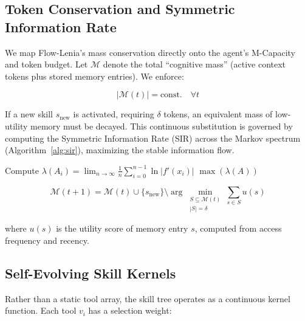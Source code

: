\documentclass[11pt,a4paper]{article}
\begin{document}
\subsection{Token Conservation and Symmetric Information Rate}

We map Flow-Lenia's mass conservation directly onto the agent's M-Capacity and token budget. Let $\mathcal{M}$ denote the total ``cognitive mass'' (active context tokens plus stored memory entries). We enforce:

\begin{equation}
    |\mathcal{M}(t)| = \text{const.} \quad \forall t
    \label{eq:mass_conservation}
\end{equation}

\noindent If a new skill $s_{\text{new}}$ is activated, requiring $\delta$ tokens, an equivalent mass of low-utility memory must be decayed. This continuous substitution is governed by computing the Symmetric Information Rate (SIR) across the Markov spectrum (Algorithm~\ref{alg:sir}), maximizing the stable information flow.

\begin{algorithm}[h]
\caption{Compute Symmetric Information Rate (SIR)}
\label{alg:sir}
\begin{algorithmic}[1]
        \State Compute $\lambda(A_i) = \lim_{n\to\infty} \frac{1}{n} \sum_{i=0}^{n-1} \ln |f'(x_i)|$
    \EndFor
    \State \Return $\max(\lambda(A))$
\EndProcedure
\end{algorithmic}
\end{algorithm}

\begin{equation}
    \mathcal{M}(t+1) = \mathcal{M}(t) \cup \{s_{\text{new}}\} \setminus \arg\min_{\substack{S \subseteq \mathcal{M}(t) \\ |S| = \delta}} \sum_{s \in S} u(s)
    \label{eq:decay}
\end{equation}

\noindent where $u(s)$ is the utility score of memory entry $s$, computed from access frequency and recency.

\subsection{Self-Evolving Skill Kernels}

Rather than a static tool array, the skill tree operates as a continuous kernel function. Each tool $v_i$ has a selection weight:
\end{document}
